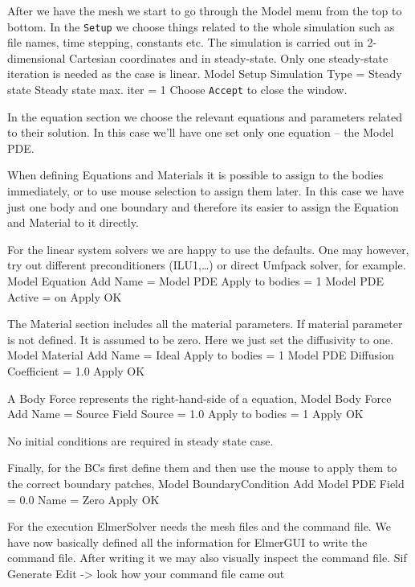 After we have the mesh we start to go through the Model menu from the top to bottom. 
In the \texttt{Setup} we choose things related to the whole simulation such as file names, 
time stepping, constants etc.
The simulation is carried out in 2-dimensional Cartesian
coordinates and in steady-state. 
Only one steady-state iteration is needed as the case is linear. 
\ttbegin
Model
  Setup 
    Simulation Type = Steady state
    Steady state max. iter = 1
\ttend
Choose \texttt{Accept} to close the window.

In the equation section we choose the relevant equations and parameters related to their solution. 
In this case we'll have one set only one equation -- the Model PDE.


When defining Equations and Materials it is possible to assign to the bodies immediately, or to use mouse
selection to assign them later. In this case we have just one body and one boundary and therefore its easier to assign 
the Equation and Material to it directly.

For the linear system solvers we are happy to use the defaults. One may however, try out different
preconditioners (ILU1,\ldots) or direct Umfpack solver, for example.
\ttbegin
Model
  Equation
    Add 
      Name = Model PDE
      Apply to bodies = 1
      Model PDE
        Active = on
  Apply   
  OK
\ttend        

The Material section includes all the material parameters.
If material parameter is not defined. It is assumed to be zero. 
Here we just set the diffusivity to one.
\ttbegin
Model
  Material
    Add 
      Name = Ideal
      Apply to bodies = 1 
      Model PDE
        Diffusion Coefficient = 1.0
    Apply
    OK
\ttend

A Body Force represents the right-hand-side of a equation,  
\ttbegin
Model
  Body Force
    Add 
      Name = Source
      Field Source = 1.0
      Apply to bodies = 1
    Apply
    OK
\ttend    

No initial conditions are required in steady state case.

Finally, for the BCs first define them and then use the mouse to apply them to the correct
boundary patches,
\ttbegin
Model
  BoundaryCondition
    Add 
      Model PDE
        Field = 0.0
      Name = Zero
    Apply
    OK
\ttend   


For the execution 
ElmerSolver needs the mesh files and the command file. We have now basically defined
all the information for ElmerGUI to write the command file. After writing it we may also visually 
inspect the command file.
\ttbegin
Sif 
  Generate
  Edit -> look how your command file came out  
\ttend

